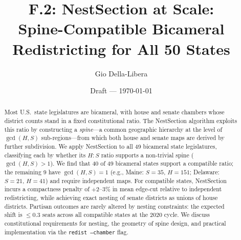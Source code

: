 \documentclass[12pt]{article}
\title{F.2: NestSection at Scale:\\
       Spine-Compatible Bicameral Redistricting for All 50 States}
\author{Gio Della-Libera}
\date{Draft --- \today}
\begin{document}
\maketitle

\begin{abstract}
Most U.S.\ state legislatures are bicameral, with house and senate chambers
whose district counts stand in a fixed constitutional ratio. The NestSection
algorithm \citep{dellaLibera2026nestSection} exploits this ratio by constructing
a \emph{spine}---a common geographic hierarchy at the level of
$\gcd(H,S)$ sub-regions---from which both house and senate maps are derived
by further subdivision. We apply NestSection to all 49 bicameral state
legislatures, classifying each by whether its $H:S$ ratio supports a
non-trivial spine ($\gcd(H,S) > 1$). We find that 40 of 49 bicameral states support a compatible ratio; the remaining 9 have
$\gcd(H,S) = 1$ (e.g., Maine: $S=35$, $H=151$; Delaware: $S=21$, $H=41$) and require independent
maps. For compatible states, NestSection incurs a compactness penalty of
$+2$--$3\%$ in mean edge-cut relative to independent redistricting, while
achieving exact nesting of senate districts as unions of house districts.
Partisan outcomes are rarely altered by nesting constraints: the expected
shift is $\leq 0.3$ seats across all compatible states at the 2020 cycle.
We discuss constitutional requirements for nesting, the geometry of spine
design, and practical implementation via the \texttt{redist --chamber}
flag.
\end{abstract}











\end{document}
